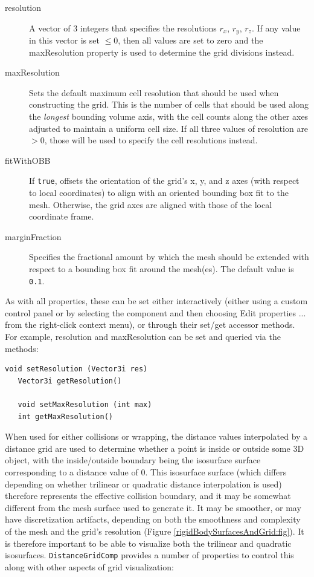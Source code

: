 \begin{description}

\item[resolution] A vector of 3 integers that specifies the
resolutions $r_x$, $r_y$, $r_z$.  If any value in this vector is set
$\le 0$, then all values are set to zero and
the {\sf maxResolution} property is used to determine the grid
divisions instead.

\item[maxResolution] Sets the default maximum cell resolution that
should be used when constructing the grid. This is the number of cells
that should be used along the {\it longest} bounding volume axis, with the
cell counts along the other axes adjusted to maintain a uniform cell
size. If all three values of {\sf resolution} are $> 0$, those
will be used to specify the cell resolutions instead.

\item[fitWithOBB] If {\tt true}, offsets the orientation of the grid's
x, y, and z axes (with respect to local coordinates) to align with an
oriented bounding box fit to the mesh. Otherwise, the grid axes are
aligned with those of the local coordinate frame.

\item[marginFraction] Specifies the fractional amount by which the
mesh should be extended with respect to a bounding box fit around
the mesh(es). The default value is {\tt 0.1}.

\end{description}

As with all properties, these can be set either interactively (either
using a custom control panel or by selecting the component and then
choosing {\sf Edit properties ...} from the right-click context
menu), or through their set/get accessor methods.  For example, {\sf
resolution} and {\sf maxResolution} can be set and queried via the
methods:
\begin{lstlisting}[]
   void setResolution (Vector3i res)
   Vector3i getResolution()

   void setMaxResolution (int max)
   int getMaxResolution()
\end{lstlisting}

When used for either collisions or wrapping, the distance values
interpolated by a distance grid are used to determine whether a point
is inside or outside some 3D object, with the inside/outside boundary
being the isosurface surface corresponding to a distance
value of 0.  This isosurface surface (which differs depending on
whether trilinear or quadratic distance interpolation is used)
therefore represents the effective collision boundary, and it may be
somewhat different from the mesh surface used to generate it. It may
be smoother, or may have discretization artifacts, depending on both
the smoothness and complexity of the mesh and the grid's resolution
(Figure \ref{rigidBodySurfacesAndGrid:fig}).  It is therefore
important to be able to visualize both the trilinear and quadratic
isosurfaces.  {\tt DistanceGridComp} provides a number of properties
to control this along with other aspects of grid visualization:

